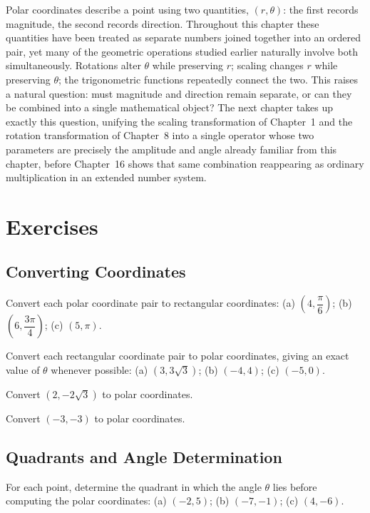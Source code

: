 Polar coordinates describe a point using two quantities, $(r,\theta)$:
the first records magnitude, the second records direction. Throughout
this chapter these quantities have been treated as separate numbers
joined together into an ordered pair, yet many of the geometric
operations studied earlier naturally involve both simultaneously.
Rotations alter $\theta$ while preserving $r$; scaling changes $r$ while
preserving $\theta$; the trigonometric functions repeatedly connect the
two. This raises a natural question: must magnitude and direction remain
separate, or can they be combined into a single mathematical object? The
next chapter takes up exactly this question, unifying the scaling
transformation of Chapter~1 and the rotation transformation of Chapter~8
into a single operator whose two parameters are precisely the amplitude
and angle already familiar from this chapter, before Chapter~16 shows
that same combination reappearing as ordinary multiplication in an
extended number system.

\section{Exercises}

\subsection*{Converting Coordinates}
\begin{exercise}
Convert each polar coordinate pair to rectangular coordinates: (a)
$\left(4,\dfrac{\pi}{6}\right)$; (b) $\left(6,\dfrac{3\pi}{4}\right)$; (c)
$(5,\pi)$.
\end{exercise}

\begin{exercise}
Convert each rectangular coordinate pair to polar coordinates, giving an
exact value of $\theta$ whenever possible: (a) $(3,3\sqrt3)$; (b)
$(-4,4)$; (c) $(-5,0)$.
\end{exercise}

\begin{exercise}
Convert $(2,-2\sqrt3)$ to polar coordinates.
\end{exercise}

\begin{exercise}
Convert $(-3,-3)$ to polar coordinates.
\end{exercise}

\subsection*{Quadrants and Angle Determination}
\begin{exercise}
For each point, determine the quadrant in which the angle $\theta$ lies
before computing the polar coordinates: (a) $(-2,5)$; (b) $(-7,-1)$; (c)
$(4,-6)$.
\end{exercise}

